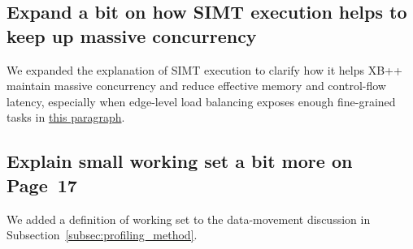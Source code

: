 \subsection{Expand a bit on how SIMT execution helps to keep up massive concurrency}
\label{subsec:rev-simt-concurrency}
We expanded the explanation of SIMT execution to clarify how it helps XB++ maintain massive concurrency and reduce effective memory and control-flow latency, especially when edge-level load balancing exposes enough fine-grained tasks in \hyperref[para:smit_execution]{this paragraph}.

\subsection{Explain small working set a bit more on Page~17}
\label{subsec:rev-working-set}
We added a definition of working set to the data-movement discussion in Subsection~\ref{subsec:profiling_method}.
